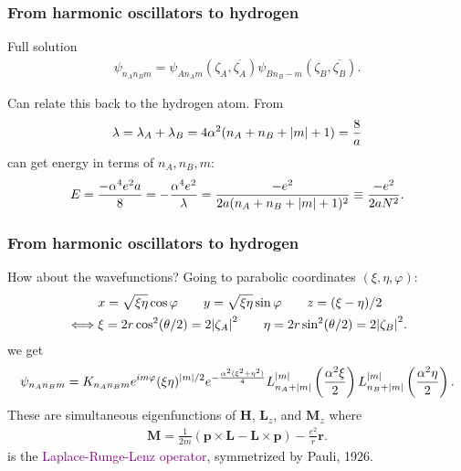 \documentclass{beamer}
\theoremstyle{definition}
\newcommand{\lp}{\left(}
\newcommand{\rp}{\right)}
\newcommand{\f}[2]{\frac{#1}{#2}}
\newcommand{\al}{\alpha}
\begin{document}
\begin{frame}
\frametitle{From harmonic oscillators to hydrogen}

Full solution
\begin{align*}
\psi_{n_A n_B m} = \psi_{An_A m}\lp \zeta_A, \overline{\zeta_A}\rp \psi_{Bn_B- m}\lp \zeta_B, \overline{\zeta_B} \rp.
\end{align*}

\pause 

Can relate this back to the hydrogen atom. \pause From 
\begin{align*}
\lambda = \lambda_A + \lambda_B =  4\al^2 (n_A + n_B + \abs{m} + 1) = \f{8}{a}
\end{align*}
can get energy in terms of $n_A, n_B, m$:
\begin{align*}
E = \f{-\al^4 e^2 a}{8} = -\f{\al^4 e^2 }{\lambda} = \f{-e^2 }{2a(n_A + n_B + \abs{m} + 1)^2} \equiv \f{-e^2}{2aN^2}.
\end{align*}


\end{frame}



\begin{frame}
\frametitle{From harmonic oscillators to hydrogen}
How about the wavefunctions? 
\pause Going to parabolic coordinates $(\xi, \eta, \varphi)$:
\begin{align*}
&x = \sqrt{\xi\eta}\cos\varphi \quad\quad y = \sqrt{\xi\eta}\sin\varphi \quad\quad z = (\xi - \eta)/2\\
\iff 
&\xi = 2r\cos^2 (\theta/2) = 2\abs{\zeta_A}^2  \quad\quad \eta = 2r\sin^2 (\theta/2) = 2\abs{\zeta_B}^2. 
\end{align*}
\pause
we get
\begin{align*}
\psi_{n_A n_B m} = K_{n_An_B m} e^{im\varphi} (\xi \eta)^{\abs{m}/2}  e^{ -\f{\al^2(\xi^2 + \eta^2)}{4}}
L_{n_A + \abs{m}}^{\abs{m}} \lp\f{\al^2 \xi}{2} \rp
L_{n_B + \abs{m}}^{\abs{m}} \lp\f{\al^2 \eta}{2} \rp.
\end{align*}
\pause 
These are simultaneous eigenfunctions of $\mathbf{H}$, 
\pause $\mathbf{L}_z$, 
\pause and $\mathbf{M}_z$ where
\begin{align*}
\mathbf{M} = \f{1}{2m} (\mathbf{p}\times \mathbf{L} - \mathbf{L}\times \mathbf{p}) - \f{e^2}{r} \mathbf{r}.
\end{align*}
is the \textcolor{purple}{Laplace-Runge-Lenz operator}, symmetrized by Pauli, 1926.

\end{frame}
\end{document}
